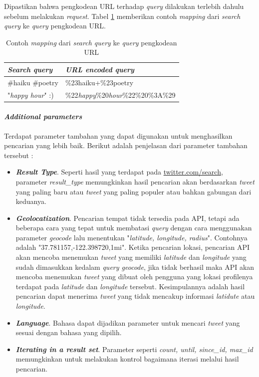 Dipastikan bahwa pengkodean URL terhadap \textit{query} dilakukan terlebih dahulu sebelum melakukan \textit{request}. Tabel \ref{tab:ContohMappingDariSeachQuery} memberikan contoh \textit{mapping} dari \textit{search query} ke \textit{query} pengkodean URL.

\begin{table}[h]
\caption{Contoh \textit{mapping} dari \textit{search query} ke \textit{query} pengkodean URL}
\label{tab:ContohMappingDariSeachQuery}
\begin{tabular}{|l|l|}
\hline
\textbf{\textit{Search query}}     & \textbf{\textit{URL encoded query}}                 \\ \hline
\#haiku \#poetry & \%23haiku+\%23poetry              \\
"\textit{happy hour}" :)  & \%22\textit{happy}\%20\textit{hour}\%22\%20\%3A\%29 \\ \hline
\end{tabular}
\end{table}

\paragraph{\textit{Additional parameters}}
Terdapat parameter tambahan yang dapat digunakan untuk menghasilkan pencarian yang lebih baik. Berikut adalah penjelasan dari parameter tambahan tersebut :

\begin{itemize}
	\item \textbf{\textit{Result Type}}. Seperti hasil yang terdapat pada \url{twitter.com/search}, parameter \textit{result\_type} memungkinkan hasil pencarian akan berdasarkan \textit{tweet} yang paling baru atau \textit{tweet} yang paling populer atau bahkan gabungan dari keduanya.
	\item \textit{\textbf{Geolocatization}}. Pencarian tempat tidak tersedia pada API, tetapi ada beberapa cara yang tepat untuk membatasi \textit{query} dengan cara menggunakan parameter \textit{geocode} lalu menentukan "\textit{latitude, longitude, radius}". Contohnya adalah "37.781157,-122.398720,1mi". Ketika pencarian lokasi, pencarian API akan mencoba menemukan \textit{tweet} yang memiliki \textit{latitude} dan \textit{longitude} yang sudah dimasukkan kedalam \textit{query geocode}, jika tidak berhasil maka API akan mencoba menemukan \textit{tweet} yang dibuat oleh pengguna yang lokasi profilenya terdapat pada \textit{latitude} dan \textit{longitude} tersebut. Kesimpulannya adalah hasil pencarian dapat menerima \textit{tweet} yang tidak mencakup informasi \textit{latidute} atau \textit{longitude}.
	\item \textit{\textbf{Language}}. Bahasa dapat dijadikan parameter untuk mencari \textit{tweet} yang sesuai dengan bahasa yang dipilih.
	\item \textbf{\textit{Iterating in a result set}}. Parameter seperti \textit{count, until, since\_id, max\_id} memungkinkan untuk melakukan kontrol bagaimana iterasi melalui hasil pencarian.
\end{itemize}

